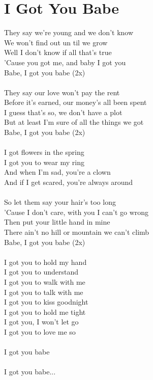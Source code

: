 \section{I Got You Babe}
\color{red}
They say we're young and we don't know\\
We won't find out un til we grow\\
\color{blue}
Well I don't know if all that's true\\
'Cause you got me, and baby I got you\\
Babe, \color{black}I got you babe (2x)\\
\\
\color{red}
They say our love won't pay the rent\\
Before it's earned, our money's all been spent\\
\color{blue}
I guess that's so, we don't have a plot\\
But at least I'm sure of all the things we got\\
Babe, \color{black}I got you babe (2x)\\
\\
\color{blue}
I got flowers in the spring\\
I got you to wear my ring\\
\color{red}
And when I'm {sad, you're a clown\\
And if I get scared, you're always around\\
\\
So let them say your hair's too long\\
'Cause I don't care, with you I }can't go wrong\\
\color{blue}
Then put your little hand in mine\\
There ain't no hill or mountain we can't climb\\
Babe, \color{black}I got you babe (2x)\\
\\
\color{blue} I got you to hold my hand\\
\color{red} I got you to understand\\
\color{blue} I got you to walk with me\\
\color{red} I got you to talk with me\\
\color{blue} I got you to kiss goodnight\\
\color{red} I got you to hold me tight\\
\color{blue} I got you, I won't let go\\
\color{red} I got you to love me so\\
\\ \color{black}
I got  you babe\\
\\
I got you babe...
